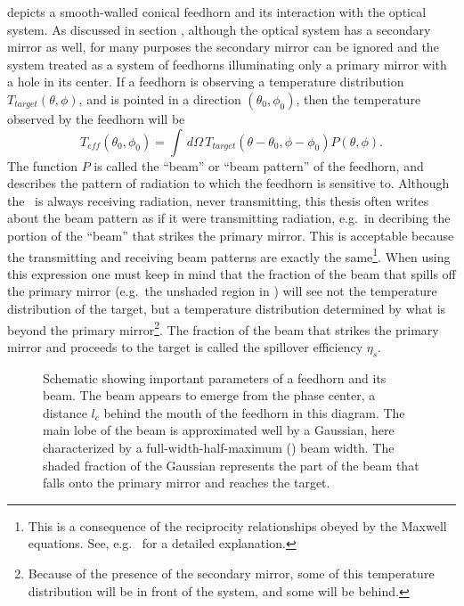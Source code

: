  depicts a smooth-walled conical feedhorn and its interaction with the optical system.
As discussed in section , although the optical system has a secondary mirror as well, for many purposes the secondary mirror can be ignored and the system treated as a system of feedhorns illuminating only a primary mirror with a hole in its center.
If a feedhorn is observing a temperature distribution $T_{target}(\theta,\phi)$, and is pointed in a direction $(\theta_0, \phi_0)$, then the temperature observed by the feedhorn will be
\begin{equation}
    T_{eff}(\theta_0,\phi_0) = \int \, d \Omega \, T_{target}(\theta - \theta_0,\phi - \phi_0) P(\theta,\phi).
\end{equation}
The function $P$ is called the ``beam'' or ``beam pattern'' of the feedhorn, and describes the pattern of radiation to which the feedhorn is sensitive to.
Although the \Imager\ is always receiving radiation, never transmitting, this thesis often writes about the beam pattern as if it were transmitting radiation, e.g.\ in decribing the portion of the ``beam'' that strikes the primary mirror.
This is acceptable because the transmitting and receiving beam patterns are exactly the same\footnote{This is a consequence of the reciprocity relationships obeyed by the Maxwell equations. See, e.g.\ \cite{balanis_antenna_2005} for a detailed explanation.}.
When using this expression one must keep in mind that the fraction of the beam that spills off the primary mirror (e.g.\ the unshaded region in ) will see not the temperature distribution of the target, but a temperature distribution determined by what is beyond the primary mirror\footnote{Because of the presence of the secondary mirror, some of this temperature distribution will be in front of the system, and some will be behind.}.
The fraction of the beam that strikes the primary mirror and proceeds to the target is called the spillover efficiency $\eta_s$.

\begin{figure*}
\centering

\caption{Schematic showing important parameters of a feedhorn and its beam. The beam appears to emerge from the phase center, a distance $l_c$ behind the mouth of the feedhorn in this diagram. The main lobe of the beam is approximated well by a Gaussian, here characterized by a full-width-half-maximum (\FWHM) beam width. The shaded fraction of the Gaussian represents the part of the beam that falls onto the primary mirror and reaches the target.}
\label{fig:feedhorn-parms}
\end{figure*}

